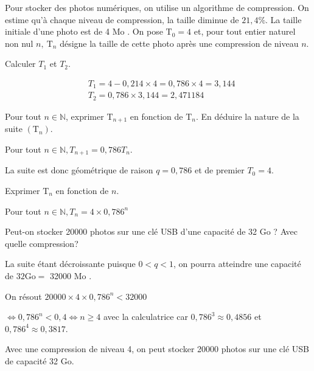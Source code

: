 \documentclass[11pt,a4paper]{article}  %
\begin{document}
Pour stocker des photos numériques, on utilise un algorithme de compression. On estime qu'à chaque niveau de compression, la taille diminue de $21,4 \%$.
La taille initiale d'une photo est de 4 Mo . On pose $\mathrm{T}_0=4$ et, pour tout entier naturel non nul $n, \mathrm{~T}_n$ désigne la taille de cette photo après une compression de niveau $n$.
\begin{enumMet}
	\item Calculer $T_1$ et $T_2$.
	\begin{corrBox}
		$$
		\begin{aligned}
			& T_1=4-0,214 \times 4=0,786 \times 4=3,144 \\
			& T_2=0,786 \times 3,144=2,471184
		\end{aligned}
		$$		
	\end{corrBox}
	\item Pour tout $n \in \mathbb{N}$, exprimer $\mathrm{T}_{n+1}$ en fonction de $\mathrm{T}_n$. En déduire la nature de la suite $\left(\mathrm{T}_n\right)$.
	\begin{corrBox}
		Pour tout $n \in \mathbb{N}, T_{n+1}=0,786 T_n$.
		
		La suite est donc géométrique de raison $q=0,786$ et de premier $T_0=4$.		
	\end{corrBox}
	\item Exprimer $\mathrm{T}_n$ en fonction de $n$.
	\begin{corrBox}
		Pour tout $n \in \mathbb{N}, T_n=4 \times 0,786^n$		
	\end{corrBox}
	\item Peut-on stocker 20000 photos sur une clé USB d'une capacité de 32 Go ? Avec quelle compression?
	\begin{corrBox}
		La suite étant décroissante puisque $0<q<1$, on pourra atteindre une capacité de $32 \mathrm{Go}=$ 32000 Mo .
		
		On résout $20000 \times 4 \times 0,786^n<32000$
		
		$\iff 0,786^n<0,4 \iff n \geqslant 4$ avec la calculatrice car $0,786^3 \approx 0,4856$ et $0,786^4 \approx 0,3817$.
		
		Avec une compression de niveau 4, on peut stocker 20000 photos sur une clé USB de capacité 32 Go.		
	\end{corrBox}
\end{enumMet}
\end{document}
